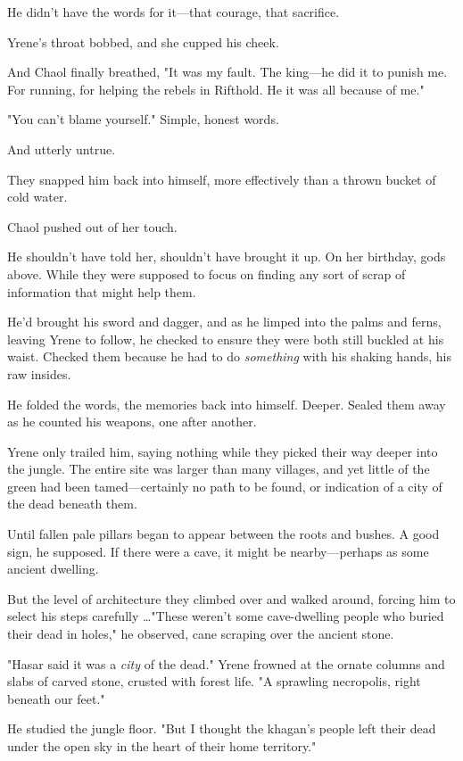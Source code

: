 He didn't have the words for it---that courage, that sacrifice.

Yrene's throat bobbed, and she cupped his cheek.

And Chaol finally breathed, "It was my fault.
The king---he did it to punish me.
For running, for helping the rebels in Rifthold.
He 
it was all because of me."

"You can't blame yourself."
Simple, honest words.

And utterly untrue.

They snapped him back into himself, more effectively than a thrown bucket of cold water.

Chaol pushed out of her touch.

He shouldn't have told her, shouldn't have brought it up.
On her birthday, gods above.
While they were supposed to focus on finding any sort of scrap of information that might help them.

He'd brought his sword and dagger, and as he limped into the palms and ferns, leaving Yrene to follow, he checked to ensure they were both still buckled at his waist.
Checked them because he had to do \emph{something} with his shaking hands, his raw insides.

He folded the words, the memories back into himself.
Deeper.
Sealed them away as he counted his weapons, one after another.

Yrene only trailed him, saying nothing while they picked their way deeper into the jungle.
The entire site was larger than many villages, and yet little of the green had been tamed---certainly no path to be found, or indication of a city of the dead beneath them.

Until fallen pale pillars began to appear between the roots and bushes.
A good sign, he supposed.
If there were a cave, it might be nearby---perhaps as some ancient dwelling.

But the level of architecture they climbed over and walked around, forcing him to select his steps carefully \ldots"These weren't some cave-dwelling people who buried their dead in holes," he observed, cane scraping over the ancient stone.

"Hasar said it was a \emph{city} of the dead."
Yrene frowned at the ornate columns and slabs of carved stone, crusted with forest life.
"A sprawling necropolis, right beneath our feet."

He studied the jungle floor.
"But I thought the khagan's people left their dead under the open sky in the heart of their home territory."

